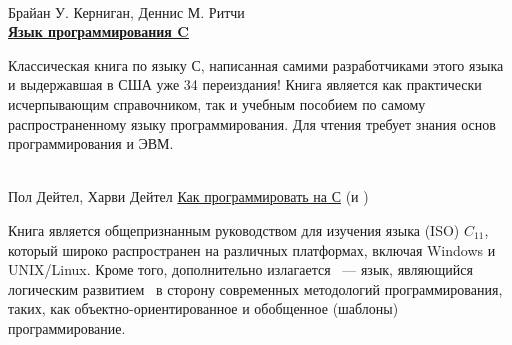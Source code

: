 \begin{thebibliography}{99}

\clearpage

 \\
	Брайан У. Керниган, Деннис М. Ритчи\\
	\href{https://www.ozon.ru/context/detail/id/2480925/}{\textbf{Язык
	программирования C}}
	
Классическая книга по языку С, написанная самими разработчиками этого языка и
выдержавшая в США уже 34 переиздания! Книга является как практически
исчерпывающим справочником, так и учебным пособием по самому распространенному
языку программирования. Для чтения требует знания основ программирования и ЭВМ.

\clearpage

 \\
	Пол Дейтел, Харви Дейтел
	\href{https://www.ozon.ru/context/detail/id/24769512/}{Как программировать на
	С} (и \Cpp)
	
Книга является общепризнанным руководством для изучения языка (ISO) $C_{11}$,
который широко распространен на различных платформах, включая Windows и
UNIX/Linux. Кроме того, дополнительно излагается \Cpp\ --- язык, являющийся
логическим развитием \Ci\ в сторону современных методологий программирования,
таких, как объектно-ориентированное и обобщенное (шаблоны) программирование.

\end{thebibliography}
